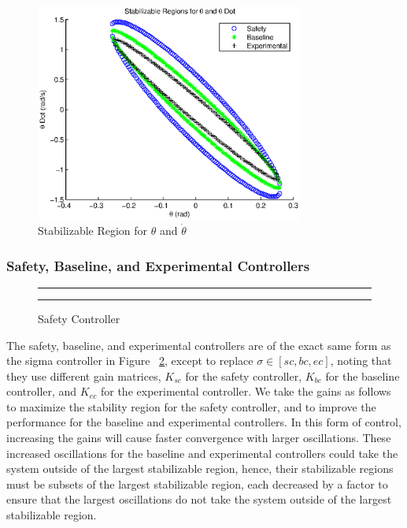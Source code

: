 \documentclass[conference]{IEEEtran}
\begin{document}
\begin{figure}[htp]
\centering
\includegraphics[width=250pt]{stabRegionTheta}
\caption{Stabilizable Region for $\theta$ and $\dot{\theta}$}\label{fig:stabRegionTheta}
\end{figure}


\subsubsection{Safety, Baseline, and Experimental Controllers}

\begin{figure}[h!]
\centering
  \hrule
  {}
  \hrule
  \caption{Safety Controller}
  \label{fig:safetyController}
\end{figure}

The safety, baseline, and experimental controllers are of the exact same form as the sigma controller in Figure ~\ref{fig:safetyController}, except to replace $\sigma\in\left[sc,bc,ec\right]$, noting that they use different gain matrices, $K_{sc}$ for the safety controller, $K_{bc}$ for the baseline controller, and $K_{ec}$ for the experimental controller.  We take the gains as follows to maximize the stability region for the safety controller, and to improve the performance for the baseline and experimental controllers.  In this form of control, increasing the gains will cause faster convergence with larger oscillations.  These increased oscillations for the baseline and experimental controllers could take the system outside of the largest stabilizable region, hence, their stabilizable regions must be subsets of the largest stabilizable region, each decreased by a factor to ensure that the largest oscillations do not take the system outside of the largest stabilizable region.
\end{document}
